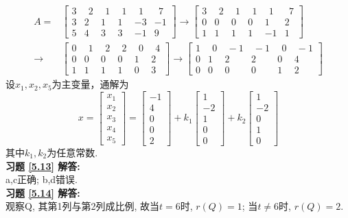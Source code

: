 \begin{displaymath}
\begin{aligned}
A=&\begin{bmatrix}3&\ \ 2&\ \ 1&\ \ 1&\ \ 1&\ \ 7\\3&2&1&1&-3&-1\\5&4&3&3&-1&9  \end{bmatrix}\rightarrow
\begin{bmatrix}3&\ \ 2&\ \ 1&\ \ 1&\ \ 1& \ \ 7\\0&0&0&0&1&2\\1&1&1&1&-1&1  \end{bmatrix}\\ \rightarrow &
\begin{bmatrix}0&\ \ 1&\ \ 2&\ \ 2& \ \ 0&\ \ 4\\0&0&0&0&1&2\\1&1&1&1&0&3  \end{bmatrix} \rightarrow
\begin{bmatrix}1&\ \ 0&\ -1&\ -1&\ \ 0&\ -1\\0&1&2&2&0&4\\0&0&0&0&1&2  \end{bmatrix}
\end{aligned} \end{displaymath}
设$x_1,x_2,x_5$为主变量，通解为
\begin{displaymath}
x=\begin{bmatrix}x_1\\x_2\\x_3\\x_4\\x_5\end{bmatrix}=\begin{bmatrix}-1\\4\\0\\0\\2\end{bmatrix}
+k_1\begin{bmatrix}1\\-2\\1\\0\\0\end{bmatrix}+k_2\begin{bmatrix}1\\-2\\0\\1\\0\end{bmatrix}
\end{displaymath}
其中$k_1,k_2$为任意常数.\\
\textbf{习题 \ref{5.13} 解答:}\\
a,c正确; b,d错误.\\
\textbf{习题 \ref{5.14} 解答:}\\
观察Q, 其第1列与第2列成比例, 故当$t=6$时, $r(Q)=1$;  当$t≠6$时, $r(Q)=2$.

